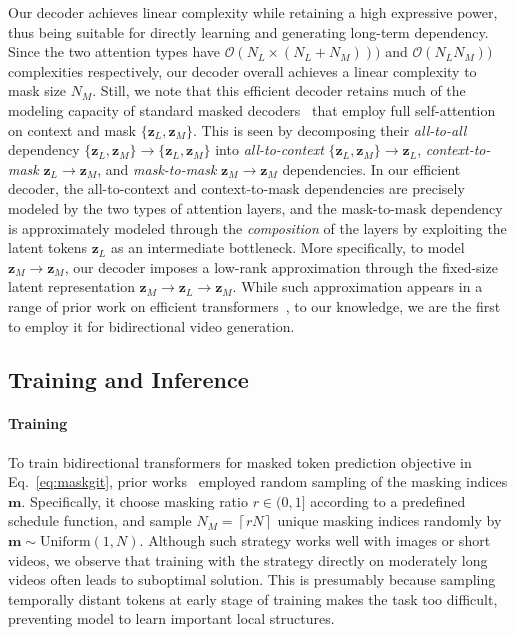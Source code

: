 \documentclass[10pt,twocolumn,letterpaper]{article}
\begin{document}
Our decoder achieves linear complexity while retaining a high expressive power, thus being suitable for directly learning and generating long-term dependency.
Since the two attention types have $\mathcal{O}(N_L \times (N_L+N_M)))$ and $\mathcal{O}(N_LN_M))$ complexities respectively, our decoder overall achieves a linear complexity to mask size $N_M$.
Still, we note that this efficient decoder retains much of the modeling capacity of standard masked decoders~\cite{BERT, MAE, MaskGIT} that employ full self-attention on context and mask $\{\mathbf{z}_L, \mathbf{z}_M\}$.
This is seen by decomposing their \emph{all-to-all} dependency $\{\mathbf{z}_L, \mathbf{z}_M\}\to\{\mathbf{z}_L, \mathbf{z}_M\}$ into \emph{all-to-context} $\{\mathbf{z}_L, \mathbf{z}_M\}\to \mathbf{z}_L$, \emph{context-to-mask} $\mathbf{z}_L\to\mathbf{z}_M$, and \emph{mask-to-mask} $\mathbf{z}_M\to\mathbf{z}_M$ dependencies.
In our efficient decoder, the all-to-context and context-to-mask dependencies are precisely modeled by the two types of attention layers, and the mask-to-mask dependency is approximately modeled through the \emph{composition} of the layers by exploiting the latent tokens $\mathbf{z}_L$ as an intermediate bottleneck.
More specifically, to model $\mathbf{z}_M\to\mathbf{z}_M$, our decoder imposes a low-rank approximation through the fixed-size latent representation $\mathbf{z}_M\to\mathbf{z}_L\to\mathbf{z}_M$.
While such approximation appears in a range of prior work on efficient transformers~\cite{SetTransformer, Linformer, LUNA, SetVAE}, to our knowledge, we are the first to employ it for bidirectional video generation.


























\subsection{Training and Inference}
\label{sec:train_inference}
\paragraph{Training} 
To train bidirectional transformers for masked token prediction objective in Eq.~\eqref{eq:maskgit}, prior works~\cite{MaskGIT,MaskViT} employed random sampling of the masking indices $\mathbf{m}$. 
Specifically, it choose masking ratio $r \in (0, 1]$ according to a predefined schedule function, and sample $N_M = \left \lceil r N \right \rceil$ unique masking indices randomly by $\mathbf{m}\sim\text{Uniform}(1,N)$.
Although such strategy works well with images or short videos, we observe that training with the strategy directly on moderately long videos often leads to suboptimal solution.  
This is presumably because sampling temporally distant tokens at early stage of training makes the task too difficult, preventing model to learn important local structures. 
\end{document}
